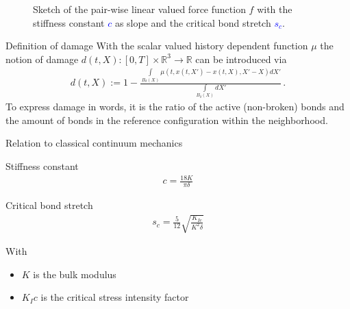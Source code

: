 \documentclass[12pt,t]{beamer}
\newcommand{\R}{\mathbb{R}}
\newcommand{\args}{(t,x(t,X')-x(t,X),X'-X)}
\begin{document}
\begin{frame}{}
\begin{figure}[H]
\caption[Sketch of the pair-wise linear valued force function $f$ with the stiffness constant $c$ as slope and the critical bond stretch $s_c$.]{Sketch of the pair-wise linear valued force function $f$ with the stiffness constant \textcolor{blue}{$c$} as slope and the critical bond stretch \textcolor{blue}{$s_c$}.}
\label{fig::force::sketch::critical}
\end{figure}
\end{frame}

\begin{frame}{Definition of damage}
With the scalar valued history dependent function $\mu$ the notion of damage $d(t,X):[0,T]\times\R^3\rightarrow\R$ can be introduced via
\begin{align*}
d(t,X):= 1- \frac{\displaystyle\int\limits_{B_\delta(X)}\mu\args dX'}{\displaystyle\int\limits_{B_\delta(X)}dX'}\,\text{.}
\label{eq::damage:nodal}
\end{align*}
To express damage in words, it is the ratio of the active (non-broken) bonds and the amount of bonds in the reference configuration within the neighborhood.
\end{frame}



\begin{frame}{Relation to classical continuum mechanics}
\begin{block}{Stiffness constant}
\begin{align*}
c = \frac{18K}{\pi\delta}
\end{align*}
\end{block}
\vspace{-0.25cm}
\begin{block}{Critical bond stretch}
\begin{align*}
s_c = \frac{5}{12} \sqrt{\frac{K_{Ic}}{K^2\delta}}
\end{align*}
\end{block}
\vspace{-0.25cm}
With
\begin{itemize}
\item $K$ is the bulk modulus
\item $K_Ic$ is the critical stress intensity factor
\end{itemize}
\end{frame}
\end{document}
